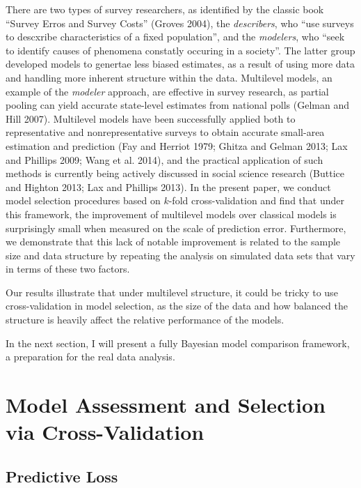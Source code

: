 \documentclass[11pt,article,oneside]{memoir}
\begin{document}
There are two types of survey researchers, as identified by the classic
book ``Survey Erros and Survey Costs'' (Groves 2004), the
\emph{describers}, who ``use surveys to descxribe characteristics of a
fixed population'', and the \emph{modelers}, who ``seek to identify
causes of phenomena constatly occuring in a society''. The latter group
developed models to genertae less biased estimates, as a result of using
more data and handling more inherent structure within the data.
Multilevel models, an example of the \emph{modeler} approach, are
effective in survey research, as partial pooling can yield accurate
state-level estimates from national polls (Gelman and Hill 2007).
Multilevel models have been successfully applied both to representative
and nonrepresentative surveys to obtain accurate small-area estimation
and prediction (Fay and Herriot 1979; Ghitza and Gelman 2013; Lax and
Phillips 2009; Wang et al. 2014), and the practical application of such
methods is currently being actively discussed in social science research
(Buttice and Highton 2013; Lax and Phillips 2013). In the present paper,
we conduct model selection procedures based on \(k\)-fold
cross-validation and find that under this framework, the improvement of
multilevel models over classical models is surprisingly small when
measured on the scale of prediction error. Furthermore, we demonstrate
that this lack of notable improvement is related to the sample size and
data structure by repeating the analysis on simulated data sets that
vary in terms of these two factors.

Our results illustrate that under multilevel structure, it could be
tricky to use cross-validation in model selection, as the size of the
data and how balanced the structure is heavily affect the relative
performance of the models.

In the next section, I will present a fully Bayesian model comparison
framework, a preparation for the real data analysis.

\section{Model Assessment and Selection via
Cross-Validation}\label{model-assessment-and-selection-via-cross-validation}

\subsection{Predictive Loss}\label{predictive-loss}
\end{document}
